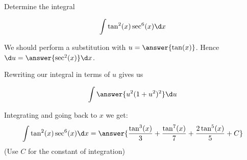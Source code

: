 \documentclass{ximera}
\author{Jason Miller}
\begin{document}
\begin{exercise}
Determine the integral

\[
\int \tan^{2}(x) \sec^{6}(x) \d x
\]

We should perform a substitution with $u=\answer{ \tan(x)}$. Hence $\d u= \answer{ \sec^{2}(x)} \d x$. 

\begin{exercise}
Rewriting our integral in terms of $u$ gives us 

\[
\int \answer{u^{2} (1+ u^{2})^{2} } \d u
\]
\begin{exercise}
Integrating and going back to $x$ we get:
\[
\int \tan^{2}(x) \sec^{6}(x) \d x= \answer{  \frac{\tan^{3}(x)}{3} +\frac{ \tan^{7}(x)}{7} + \frac{ 2 \tan^{5}(x)}{5} +C    }
\]
(Use $C$ for the constant of integration)
\end{exercise}
\end{exercise}
\end{exercise}
\end{document}
